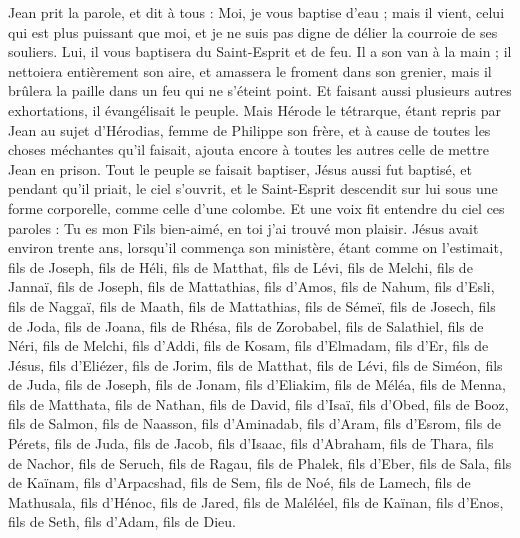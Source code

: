 \begin{multicols}{2}
Jean prit la parole, et dit à tous : Moi, je vous baptise d'eau ; mais il vient, celui qui est plus puissant que moi, et je ne suis pas digne de délier la courroie de ses souliers. Lui, il vous baptisera du Saint-Esprit et de feu.
Il a son van à la main ; il nettoiera entièrement son aire, et amassera le froment dans son grenier, mais il brûlera la paille dans un feu qui ne s'éteint point.
Et faisant aussi plusieurs autres exhortations, il évangélisait le peuple.
Mais Hérode le tétrarque, étant repris par Jean au sujet d'Hérodias, femme de Philippe son frère, et à cause de toutes les choses méchantes qu’il faisait,
ajouta encore à toutes les autres celle de mettre Jean en prison.
Tout le peuple se faisait baptiser, Jésus aussi fut baptisé, et pendant qu’il priait, le ciel s'ouvrit,
et le Saint-Esprit descendit sur lui sous une forme corporelle, comme celle d'une colombe. Et une voix fit entendre du ciel ces paroles : Tu es mon Fils bien-aimé, en toi j’ai trouvé mon plaisir.
Jésus avait environ trente ans, lorsqu’il commença son ministère, étant comme on l’estimait, fils de Joseph, fils de Héli,
fils de Matthat, fils de Lévi, fils de Melchi, fils de Jannaï, fils de Joseph,
fils de Mattathias, fils d'Amos, fils de Nahum, fils d'Esli, fils de Naggaï,
fils de Maath, fils de Mattathias, fils de Sémeï, fils de Josech, fils de Joda,
fils de Joana, fils de Rhésa, fils de Zorobabel, fils de Salathiel, fils de Néri,
fils de Melchi, fils d'Addi, fils de Kosam, fils d'Elmadam, fils d'Er,
fils de Jésus, fils d'Eliézer, fils de Jorim, fils de Matthat, fils de Lévi,
fils de Siméon, fils de Juda, fils de Joseph, fils de Jonam, fils d'Eliakim,
fils de Méléa, fils de Menna, fils de Matthata, fils de Nathan, fils de David,
fils d’Isaï, fils d'Obed, fils de Booz, fils de Salmon, fils de Naasson,
fils d'Aminadab, fils d'Aram, fils d'Esrom, fils de Pérets, fils de Juda,
fils de Jacob, fils d'Isaac, fils d'Abraham, fils de Thara, fils de Nachor,
fils de Seruch, fils de Ragau, fils de Phalek, fils d'Eber, fils de Sala,
fils de Kaïnam, fils d’Arpacshad, fils de Sem, fils de Noé, fils de Lamech,
fils de Mathusala, fils d'Hénoc, fils de Jared, fils de Maléléel, fils de Kaïnan,
fils d'Enos, fils de Seth, fils d'Adam, fils de Dieu.

\end{multicols}

